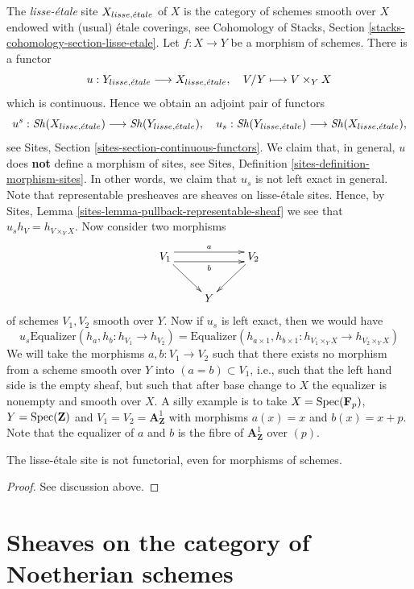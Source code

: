 \noindent
The {\it lisse-\'etale} site
$X_{lisse,{\acute{e}tale}}$ of $X$ is the category of schemes smooth over $X$
endowed with (usual) \'etale coverings, see
Cohomology of Stacks, Section \ref{stacks-cohomology-section-lisse-etale}.
Let $f : X  \to Y$ be a morphism of schemes.
There is a functor
$$
u : Y_{lisse,{\acute{e}tale}} \longrightarrow X_{lisse,{\acute{e}tale}},\quad
V/Y \longmapsto V \times_Y X
$$
which is continuous. Hence we obtain an adjoint pair of functors
$$
u^s :
\mathop{\mathit{Sh}}\nolimits(X_{lisse,{\acute{e}tale}})
\longrightarrow
\mathop{\mathit{Sh}}\nolimits(Y_{lisse,{\acute{e}tale}}),
\quad
u_s :
\mathop{\mathit{Sh}}\nolimits(Y_{lisse,{\acute{e}tale}})
\longrightarrow
\mathop{\mathit{Sh}}\nolimits(X_{lisse,{\acute{e}tale}}),
$$
see Sites, Section \ref{sites-section-continuous-functors}.
We claim that, in general, $u$ does {\bf not} define a morphism of sites, see
Sites, Definition \ref{sites-definition-morphism-sites}.
In other words, we claim that $u_s$ is not left exact in general. Note that
representable presheaves are sheaves on lisse-\'etale sites. Hence, by
Sites, Lemma \ref{sites-lemma-pullback-representable-sheaf}
we see that $u_sh_V = h_{V \times_Y X}$. Now consider two morphisms
$$
\xymatrix{
V_1 \ar[rd] \ar@<1ex>[rr]^a \ar@<-1ex>[rr]_b & & V_2 \ar[ld] \\
& Y
}
$$
of schemes $V_1, V_2$ smooth over $Y$. Now if $u_s$ is left exact, then
we would have
$$
u_s \text{Equalizer}(h_a, h_b : h_{V_1} \to h_{V_2})
=
\text{Equalizer}(h_{a \times 1}, h_{b \times 1} :
h_{V_1 \times_Y X} \to h_{V_2 \times_Y X})
$$
We will take the morphisms $a, b : V_1 \to V_2$ such that there exists
no morphism from a scheme smooth over $Y$ into $(a = b) \subset V_1$, i.e.,
such that the left hand side is the empty sheaf, but such that after
base change to $X$ the equalizer is nonempty and smooth over $X$.
A silly example is to take $X = \mathop{\mathrm{Spec}}(\mathbf{F}_p)$,
$Y = \mathop{\mathrm{Spec}}(\mathbf{Z})$ and $V_1 = V_2 = \mathbf{A}^1_\mathbf{Z}$
with morphisms $a(x) = x$ and $b(x) = x + p$. Note that the equalizer
of $a$ and $b$ is the fibre of $\mathbf{A}^1_\mathbf{Z}$ over $(p)$.

\begin{lemma}
\label{lemma-lisse-etale-not-functorial}
The lisse-\'etale site is not functorial, even for morphisms of schemes.
\end{lemma}

\begin{proof}
See discussion above.
\end{proof}






\section{Sheaves on the category of Noetherian schemes}
\label{section-sheaves-locally-Noetherian}

